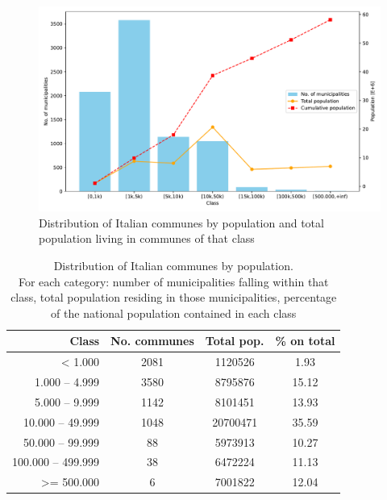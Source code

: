 \begin{figure}[tbp]
	\centering
	\includegraphics[width=\textwidth]{img/numOfComm_by_class_v2.pdf}
	\caption{Distribution of Italian communes by population and total population living in communes of that class}
	\label{fig:comm_by_class}
\end{figure}


\begin{table}[tbp]
	\centering
\begin{tabular}{rccc}
	\toprule
	Class & No. communes & Total pop. & \% on total\\
	\midrule
	< 1.000 & 2081 & 1120526 & 1.93\\
	1.000 – 4.999 & 3580 & 8795876 & 15.12\\
	5.000 – 9.999 & 1142 & 8101451 & 13.93\\
	10.000 – 49.999 & 1048 & 20700471 & 35.59\\
	50.000 – 99.999 & 88 & 5973913 & 10.27\\
	100.000 – 499.999 & 38 & 6472224 & 11.13\\
	>= 500.000 & 6 & 7001822 & 12.04\\
	\bottomrule
\end{tabular}
	\caption{Distribution of Italian communes by population.\\
		For each category:
		number of municipalities falling within that class,
		total population residing in those municipalities,
		percentage of the national population contained in each class}
	\label{tab:comm_by_class}
\end{table}

